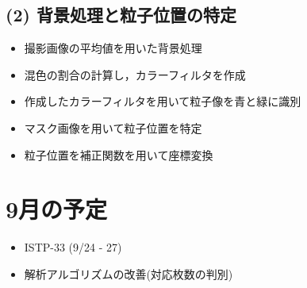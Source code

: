 \documentclass[twocolumn,a4j]{jsarticle}
\begin{document}
\subsection{(2) 背景処理と粒子位置の特定}
\begin{itemize}
  \item 撮影画像の平均値を用いた背景処理
  \item 混色の割合の計算し，カラーフィルタを作成
  \item 作成したカラーフィルタを用いて粒子像を青と緑に識別
  \item マスク画像を用いて粒子位置を特定
  \item 粒子位置を補正関数を用いて座標変換
\end{itemize}






\section{9月の予定}
\begin{itemize}
  \item ISTP-33 (9/24 - 27)
  \item 解析アルゴリズムの改善(対応枚数の判別)
\end{itemize}
\end{document}
